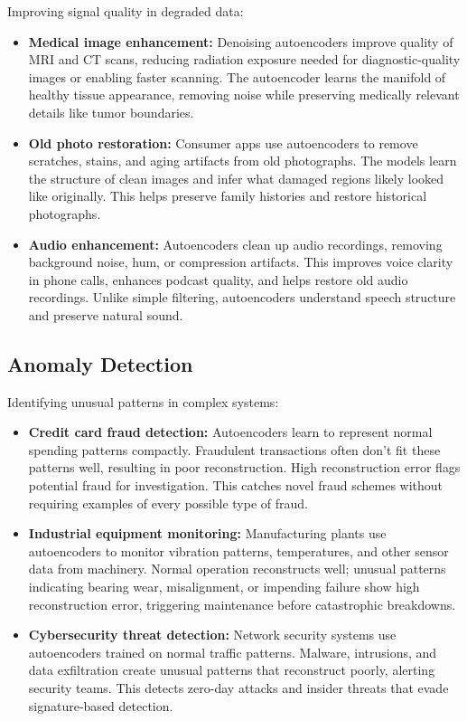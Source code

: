 Improving signal quality in degraded data:

\begin{itemize}
    \item \textbf{Medical image enhancement:} Denoising autoencoders improve quality of MRI and CT scans, reducing radiation exposure needed for diagnostic-quality images or enabling faster scanning. The autoencoder learns the manifold of healthy tissue appearance, removing noise while preserving medically relevant details like tumor boundaries.
    
    \item \textbf{Old photo restoration:} Consumer apps use autoencoders to remove scratches, stains, and aging artifacts from old photographs. The models learn the structure of clean images and infer what damaged regions likely looked like originally. This helps preserve family histories and restore historical photographs.
    
    \item \textbf{Audio enhancement:} Autoencoders clean up audio recordings, removing background noise, hum, or compression artifacts. This improves voice clarity in phone calls, enhances podcast quality, and helps restore old audio recordings. Unlike simple filtering, autoencoders understand speech structure and preserve natural sound.
\end{itemize}

\subsection{Anomaly Detection}

Identifying unusual patterns in complex systems:

\begin{itemize}
    \item \textbf{Credit card fraud detection:} Autoencoders learn to represent normal spending patterns compactly. Fraudulent transactions often don't fit these patterns well, resulting in poor reconstruction. High reconstruction error flags potential fraud for investigation. This catches novel fraud schemes without requiring examples of every possible type of fraud.
    
    \item \textbf{Industrial equipment monitoring:} Manufacturing plants use autoencoders to monitor vibration patterns, temperatures, and other sensor data from machinery. Normal operation reconstructs well; unusual patterns indicating bearing wear, misalignment, or impending failure show high reconstruction error, triggering maintenance before catastrophic breakdowns.
    
    \item \textbf{Cybersecurity threat detection:} Network security systems use autoencoders trained on normal traffic patterns. Malware, intrusions, and data exfiltration create unusual patterns that reconstruct poorly, alerting security teams. This detects zero-day attacks and insider threats that evade signature-based detection.
\end{itemize}

